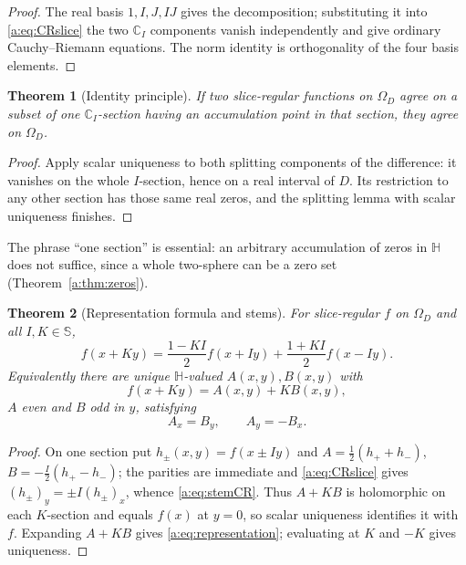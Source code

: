 \documentclass[11pt,a4paper]{article}
\numberwithin{equation}{section}
\newtheorem{theorem}{Theorem}[section]
\theoremstyle{definition}
\theoremstyle{remark}
\theoremstyle{plain}
\newcommand{\HH}{\mathbb H}
\newcommand{\CC}{\mathbb C}
\newcommand{\SSS}{\mathbb S}
\newcommand{\Om}{\Omega}
\begin{document}
\begin{proof}
The real basis $1,I,J,IJ$ gives the decomposition; substituting it into
\eqref{a:eq:CRslice} the two $\CC_I$ components vanish independently and give
ordinary Cauchy--Riemann equations. The norm identity is orthogonality of the
four basis elements.
\end{proof}

\begin{theorem}[Identity principle]
\label{a:thm:identity}
If two slice-regular functions on $\Om_D$ agree on a subset of one
$\CC_I$-section having an accumulation point in that section, they agree on
$\Om_D$.
\end{theorem}

\begin{proof}
Apply scalar uniqueness to both splitting components of the difference: it
vanishes on the whole $I$-section, hence on a real interval of $D$. Its
restriction to any other section has those same real zeros, and the splitting
lemma with scalar uniqueness finishes.
\end{proof}

The phrase ``one section'' is essential: an arbitrary accumulation of zeros in
$\HH$ does not suffice, since a whole two-sphere can be a zero set
(Theorem~\ref{a:thm:zeros}).

\begin{theorem}[Representation formula and stems]
\label{a:thm:representation}
For slice-regular $f$ on $\Om_D$ and all $I,K\in\SSS$,
\begin{equation}
 f(x+Ky)=\frac{1-KI}{2}f(x+Iy)+\frac{1+KI}{2}f(x-Iy).
 \label{a:eq:representation}
\end{equation}
Equivalently there are unique $\HH$-valued $A(x,y),B(x,y)$ with
\begin{equation}
 f(x+Ky)=A(x,y)+KB(x,y),
 \label{a:eq:AB}
\end{equation}
$A$ even and $B$ odd in $y$, satisfying
\begin{equation}
 A_x=B_y,\qquad A_y=-B_x .
 \label{a:eq:stemCR}
\end{equation}
\end{theorem}

\begin{proof}
On one section put $h_\pm(x,y)=f(x\pm Iy)$ and
$A=\tfrac12(h_++h_-)$, $B=-\tfrac I2(h_+-h_-)$; the parities are immediate and
\eqref{a:eq:CRslice} gives $(h_\pm)_y=\pm I(h_\pm)_x$, whence
\eqref{a:eq:stemCR}. Thus $A+KB$ is holomorphic on each $K$-section and equals
$f(x)$ at $y=0$, so scalar uniqueness identifies it with $f$. Expanding
$A+KB$ gives \eqref{a:eq:representation}; evaluating at $K$ and $-K$ gives
uniqueness.
\end{proof}
\end{document}

